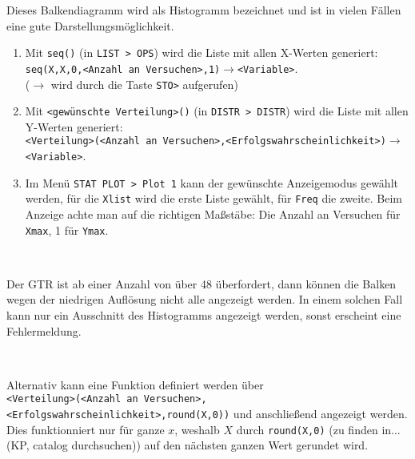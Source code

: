 \documentclass[../MAIN/main.tex]{subfiles}
\begin{document}
\begin{center}
\end{center}
\begin{Bemerkung}
  Dieses Balkendiagramm wird als Histogramm bezeichnet und ist in vielen Fällen eine gute Darstellungsmöglichkeit.
\end{Bemerkung}
\begin{GTR-Tipp}
  \begin{enumerate}
    \item Mit \texttt{seq()} (in \texttt{LIST > OPS}) wird die Liste mit allen X-Werten generiert:\\
    \texttt{seq(X,X,0,<Anzahl an Versuchen>,1)}$\rightarrow$\texttt{<Variable>}. \\
    ($\rightarrow$ wird durch die Taste \texttt{STO>} aufgerufen)
    \item Mit \texttt{<gewünschte Verteilung>()} (in \texttt{DISTR > DISTR}) wird die Liste mit allen Y-Werten generiert:\\
    \texttt{<Verteilung>(<Anzahl an Versuchen>,<Erfolgswahrscheinlichkeit>)}$\rightarrow$\texttt{<Variable>}.
    \item Im Menü \texttt{STAT PLOT > Plot 1} kann der gewünschte Anzeigemodus gewählt werden, für die \texttt{Xlist} wird die erste Liste gewählt, für \texttt{Freq} die zweite. Beim Anzeige achte man auf die richtigen Maßstäbe: Die Anzahl an Versuchen für \texttt{Xmax}, 1 für \texttt{Ymax}.
  \end{enumerate}\\
  \begin{Bemerkung}
    Der GTR ist ab einer Anzahl von über 48 überfordert, dann können die Balken wegen der niedrigen Auflösung nicht alle angezeigt werden. In einem solchen Fall kann nur ein Ausschnitt des Histogramms angezeigt werden, sonst erscheint eine Fehlermeldung.
  \end{Bemerkung}\\
  \begin{Bemerkung}
    Alternativ kann eine Funktion definiert werden über \\\texttt{<Verteilung>(<Anzahl an Versuchen>,<Erfolgswahrscheinlichkeit>,round(X,0))} und anschließend angezeigt werden.\\
    Dies funktionniert nur für ganze $x$, weshalb $X$ durch \texttt{round(X,0)} (zu finden in... (KP, catalog durchsuchen)) auf den nächsten ganzen Wert gerundet wird.
  \end{Bemerkung}
\end{GTR-Tipp}
\end{document}
